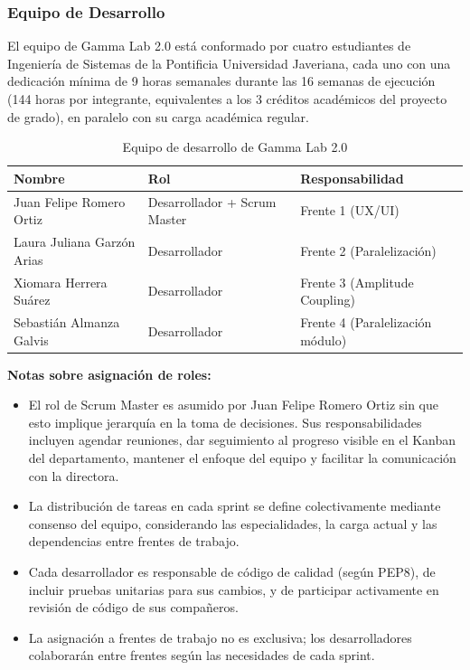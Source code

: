 \documentclass{article}
\begin{document}
\subsubsection{Equipo de Desarrollo}

El equipo de Gamma Lab 2.0 está conformado por cuatro estudiantes de Ingeniería de Sistemas de la Pontificia Universidad Javeriana, cada uno con una dedicación mínima de 9 horas semanales durante las 16 semanas de ejecución (144 horas por integrante, equivalentes a los 3 créditos académicos del proyecto de grado), en paralelo con su carga académica regular.

\begin{table}[H]
\centering
\small
\begin{tabular}{|p{2.8cm}|p{2.5cm}|p{2.5cm}|}
\hline
\textbf{Nombre} & \textbf{Rol} & \textbf{Responsabilidad} \\
\hline
Juan Felipe Romero Ortiz & Desarrollador + Scrum Master & Frente 1 (UX/UI) \\
\hline
Laura Juliana Garzón Arias & Desarrollador & Frente 2 (Paralelización) \\
\hline
Xiomara Herrera Suárez & Desarrollador & Frente 3 (Amplitude Coupling) \\
\hline
Sebastián Almanza Galvis & Desarrollador & Frente 4 (Paralelización módulo) \\
\hline
\end{tabular}
\caption{Equipo de desarrollo de Gamma Lab 2.0}
\label{tab:equipo}
\end{table}

\textbf{Notas sobre asignación de roles:}

\begin{itemize}
    \item El rol de Scrum Master es asumido por Juan Felipe Romero Ortiz sin que esto implique jerarquía en la toma de decisiones. Sus responsabilidades incluyen agendar reuniones, dar seguimiento al progreso visible en el Kanban del departamento, mantener el enfoque del equipo y facilitar la comunicación con la directora.
    
    \item La distribución de tareas en cada sprint se define colectivamente mediante consenso del equipo, considerando las especialidades, la carga actual y las dependencias entre frentes de trabajo.
    
    \item Cada desarrollador es responsable de código de calidad (según PEP8), de incluir pruebas unitarias para sus cambios, y de participar activamente en revisión de código de sus compañeros.
    
    \item La asignación a frentes de trabajo no es exclusiva; los desarrolladores colaborarán entre frentes según las necesidades de cada sprint.
\end{itemize}
\end{document}
